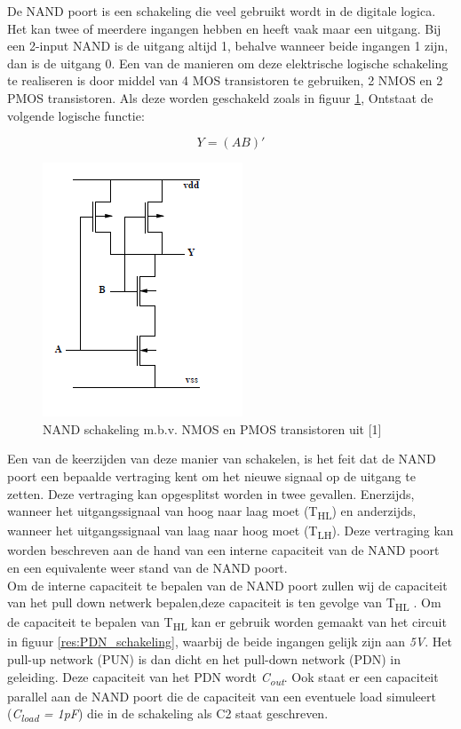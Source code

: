 \documentclass{article}
\begin{document}
\newcommand{\tss}{\textsubscript}

De NAND poort is een schakeling die veel gebruikt wordt in de digitale logica. Het kan twee of meerdere ingangen hebben en heeft vaak maar een uitgang. Bij een 2-input NAND is de uitgang altijd 1, behalve wanneer beide ingangen 1 zijn, dan is de uitgang 0. Een van de manieren om deze elektrische logische schakeling te realiseren is door middel van 4 MOS transistoren te gebruiken, 2 NMOS en 2 PMOS transistoren. Als deze worden geschakeld zoals in figuur \ref{res:NAND_schakeling}, Ontstaat de volgende logische functie: 

\begin{equation}
Y = (AB)'
\end{equation}

 \begin{figure} [h!]
 \begin{center}
 \includegraphics [scale = 1] {../figures/NAND}
 \caption{NAND schakeling m.b.v. NMOS en PMOS transistoren uit [1]}
 \label{res:NAND_schakeling}
 \end{center}
 \end{figure}

Een van de keerzijden van deze manier van schakelen, is het feit dat de NAND poort een bepaalde vertraging kent om het nieuwe signaal op de uitgang te zetten. Deze vertraging kan opgesplitst worden in twee gevallen. Enerzijds, wanneer het uitgangssignaal van hoog naar laag moet (T\tss{HL}) en anderzijds, wanneer het uitgangssignaal van laag naar hoog moet (T\tss{LH}). Deze vertraging kan worden beschreven aan de hand van een interne capaciteit van de NAND poort en een equivalente weer stand van de NAND poort.\\

Om de interne capaciteit te bepalen van de NAND poort zullen wij de capaciteit van het pull down netwerk bepalen,deze capaciteit is ten gevolge van T\tss{HL} . Om de capaciteit te bepalen van T\tss{HL} kan er gebruik worden gemaakt van het  circuit in figuur \ref{res:PDN_schakeling}, waarbij de beide ingangen gelijk zijn aan \emph{5V}. Het pull-up network (PUN) is dan dicht en het pull-down network (PDN) in geleiding. Deze capaciteit van het PDN wordt \emph{C\tss{out}}. Ook staat er een capaciteit parallel aan de NAND poort die de capaciteit van een eventuele load simuleert (\emph{C\tss{load} = 1pF}) die in de schakeling als C2 staat geschreven.
\end{document}
